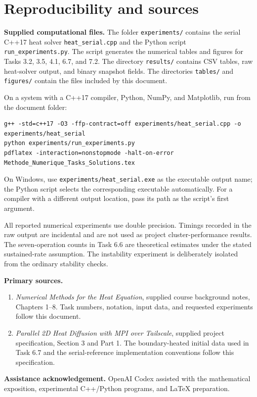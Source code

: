 \clearpage
\section*{Reproducibility and sources}
\textbf{Supplied computational files.}
The folder \texttt{experiments/} contains the serial C++17 heat solver
\texttt{heat\_serial.cpp} and the Python script \texttt{run\_experiments.py}.
The script generates the numerical tables and figures for Tasks 3.2, 3.5, 4.1, 6.7, and 7.2.
The directory \texttt{results/} contains CSV tables, raw heat-solver output, and binary snapshot fields.
The directories \texttt{tables/} and \texttt{figures/} contain the files included by this document.

On a system with a C++17 compiler, Python, NumPy, and Matplotlib, run from the document folder:
\begin{lstlisting}
g++ -std=c++17 -O3 -ffp-contract=off experiments/heat_serial.cpp -o experiments/heat_serial
python experiments/run_experiments.py
pdflatex -interaction=nonstopmode -halt-on-error Methode_Numerique_Tasks_Solutions.tex
\end{lstlisting}
On Windows, use \texttt{experiments/heat\_serial.exe} as the executable output name; the Python
script selects the corresponding executable automatically. For a compiler with a different
output location, pass its path as the script's first argument.

All reported numerical experiments use double precision. Timings recorded in the raw output
are incidental and are not used as project cluster-performance results. The seven-operation
counts in Task 6.6 are theoretical estimates under the stated sustained-rate assumption.
The instability experiment is deliberately isolated from the ordinary stability checks.

\textbf{Primary sources.}
\begin{enumerate}
\item \emph{Numerical Methods for the Heat Equation}, supplied course background notes,
Chapters 1--8. Task numbers, notation, input data, and requested experiments follow this document.
\item \emph{Parallel 2D Heat Diffusion with MPI over Tailscale}, supplied project specification,
Section 3 and Part 1. The boundary-heated initial data used in Task 6.7 and the serial-reference
implementation conventions follow this specification.
\end{enumerate}

\textbf{Assistance acknowledgement.}
OpenAI Codex assisted with the mathematical exposition, experimental C++/Python programs,
and LaTeX preparation.
